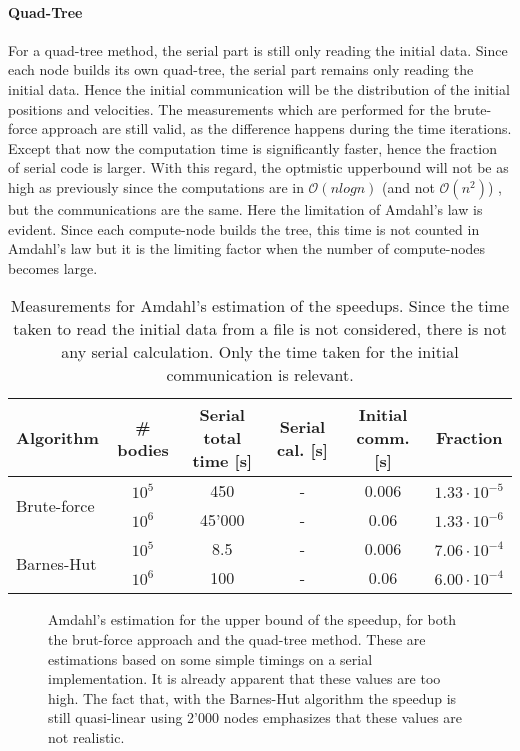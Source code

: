 \paragraph{Quad-Tree}
For a quad-tree method, the serial part is still only reading the initial data. Since each node builds its own quad-tree, the serial part remains only reading the initial data. Hence the initial communication will be the distribution of the initial positions and velocities. The measurements which are performed for the brute-force approach are still valid, as the difference happens during the time iterations. Except that now the computation time is significantly faster, hence the fraction of serial code is larger.  With this regard, the optmistic upperbound will not be as high as previously since the computations are in $\mathcal{O}(nlogn)$ (and not $\mathcal{O}(n^2)$) , but the communications are the same. Here the limitation of Amdahl's law is evident. Since each compute-node builds the tree, this time is not counted in Amdahl's law but it is the limiting factor when the number of compute-nodes becomes large.

\begin{table}[H]
\centering
\begin{tabular}{l|ccccc}
Algorithm                    & \# bodies & Serial total time [s] & Serial cal. [s] & Initial comm. [s] & Fraction \\
\hline\multirow{2}{*}{Brute-force} & $10^5$    & 450  & - & 0.006 &$1.33\cdot 10^{-5}$\\
                             & $10^6$    & 45'000& - & 0.06  &$1.33\cdot 10^{-6}$\\     
\multirow{2}{*}{Barnes-Hut}  & $10^5$    & 8.5  & - & 0.006 &$7.06\cdot 10^{-4}$\\
                             & $10^6$    & 100  & - & 0.06  &$6.00\cdot 10^{-4}$\\
\end{tabular}
\caption{Measurements for Amdahl's estimation of the speedups. Since the time taken to read the initial data from a file is not considered, there is not any serial calculation. Only the time taken for the initial communication is relevant.}
\label{tab:amdahl}
\end{table}

\begin{figure}[H]

\caption{Amdahl's estimation for the upper bound of the speedup, for both the brut-force approach and the quad-tree method. These are estimations based on some simple timings on a serial implementation. It is already apparent that these values are too high. The fact that, with the Barnes-Hut algorithm the speedup is still quasi-linear using 2'000 nodes emphasizes that these values are not realistic.}
\label{fig:amdahl}
\end{figure}


